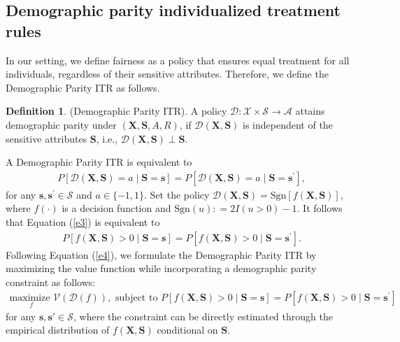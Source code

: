 \documentclass[12pt]{article}
\theoremstyle{plain}
\theoremstyle{definition}
\newtheorem{definition}[theorem]{Definition}
\theoremstyle{remark}
\begin{document}
\subsection{Demographic parity individualized treatment rules}
 In our setting, we define fairness as a policy that ensures equal treatment for all individuals, regardless of their sensitive attributes. Therefore, we define the    Demographic Parity ITR as follows.
\begin{definition}
(Demographic Parity ITR). A policy $\mathcal{D}: \mathcal{X}\times \mathcal{S}\rightarrow \mathcal{A}$ attains    demographic parity under $(\boldsymbol{X}, \boldsymbol{S}, A, R)$, if  $\mathcal{D}(\boldsymbol{X},\boldsymbol{S})$ is independent of the sensitive attributes $\boldsymbol{S}$, i.e., $\mathcal{D}(\boldsymbol{X}, \boldsymbol{S})\perp \boldsymbol{S}$.
\end{definition}
A   Demographic Parity ITR  is equivalent to
\begin{equation}
\label{e3}
\begin{aligned}
{P}[\mathcal{D}(\boldsymbol{X},\boldsymbol{S})=a \mid \boldsymbol{S}=\boldsymbol{s}]={P}[\mathcal{D}(\boldsymbol{X},\boldsymbol{S})=a\mid \boldsymbol{S}=\boldsymbol{s}^{\prime}],
\end{aligned}
\end{equation}
for any $ \boldsymbol{s},\boldsymbol{s}^{\prime} \in \mathcal{S}$ and $a \in \{-1,1\}$.
Set the policy $\mathcal{D}(\boldsymbol{X},\boldsymbol{S})=\text{Sgn}[f(\boldsymbol{X},\boldsymbol{S})]$, where $f(\cdot)$ is a decision function
and $\text{Sgn}(u): =2I(u>0)-1$. It follows that Equation (\ref{e3}) is equivalent to
\begin{equation}
\label{e4}
\begin{aligned}
{P}[f(\boldsymbol{X},\boldsymbol{S})>0 \mid \boldsymbol{S}=\boldsymbol{s}]={P}[f(\boldsymbol{X},\boldsymbol{S})>0\mid \boldsymbol{S}=\boldsymbol{s}^{\prime}].
\end{aligned}
\end{equation}
Following Equation (\ref{e4}), we formulate the    Demographic Parity ITR by maximizing the value function while incorporating a demographic parity constraint as follows:
\begin{equation}
\label{e5}
\begin{aligned}
\underset{f}{\text{maximize }} \mathcal{V}(\mathcal{D}(f)),
 \text{ subject to } {P}[f(\boldsymbol{X}, \boldsymbol{S})>0 \mid \boldsymbol{S}=\boldsymbol{s}]={P}[f(\boldsymbol{X}, \boldsymbol{S})>0\mid \boldsymbol{S}=\boldsymbol{s}^{\prime}]
\end{aligned}
\end{equation}
for any $\boldsymbol{s},\boldsymbol{s}' \in \mathcal{S}$, where the constraint can be directly estimated through the empirical distribution of $f(\boldsymbol{X}, \boldsymbol{S})$ conditional on $ \boldsymbol{S}$.
\end{document}

